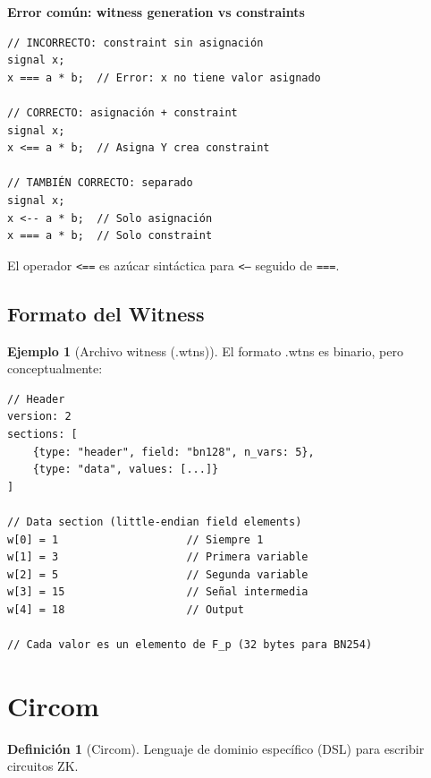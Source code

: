 \documentclass[11pt,a4paper,twoside,openright]{book}
\theoremstyle{definition}
\newtheorem{definition}{Definición}[chapter]
\newtheorem{example}{Ejemplo}[chapter]
\theoremstyle{plain}
\theoremstyle{remark}
\begin{document}
\begin{advertencia}
\textbf{Error común: witness generation vs constraints}

\begin{verbatim}
// INCORRECTO: constraint sin asignación
signal x;
x === a * b;  // Error: x no tiene valor asignado

// CORRECTO: asignación + constraint
signal x;
x <== a * b;  // Asigna Y crea constraint

// TAMBIÉN CORRECTO: separado
signal x;
x <-- a * b;  // Solo asignación
x === a * b;  // Solo constraint
\end{verbatim}

El operador \texttt{<==} es azúcar sintáctica para \texttt{<--} seguido de \texttt{===}.
\end{advertencia}

\subsection{Formato del Witness}

\begin{example}[Archivo witness (.wtns)]
El formato .wtns es binario, pero conceptualmente:

\begin{verbatim}
// Header
version: 2
sections: [
    {type: "header", field: "bn128", n_vars: 5},
    {type: "data", values: [...]}
]

// Data section (little-endian field elements)
w[0] = 1                    // Siempre 1
w[1] = 3                    // Primera variable
w[2] = 5                    // Segunda variable
w[3] = 15                   // Señal intermedia
w[4] = 18                   // Output

// Cada valor es un elemento de F_p (32 bytes para BN254)
\end{verbatim}
\end{example}

\section{Circom}

\begin{definition}[Circom]
Lenguaje de dominio específico (DSL) para escribir circuitos ZK.
\end{definition}
\end{document}
